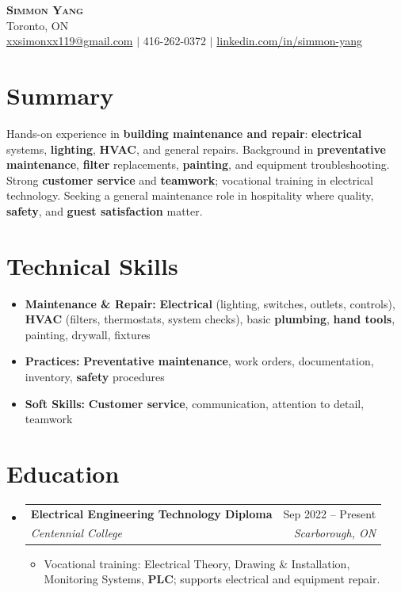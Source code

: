 \documentclass[letterpaper,11pt]{article}
\makeatletter
\newcommand{\resumeItem}[1]{\item\small{{#1 \vspace{-2pt}}}}
\newcommand{\resumeSubheading}[4]{
  \vspace{-2pt}\item
    \begin{tabular*}{0.97\textwidth}[t]{l@{\extracolsep{\fill}}r}
      \textbf{#1} & #2 \\
      \textit{\small #3} & \textit{\small #4} \\
    \end{tabular*}\vspace{-7pt}
}
\newcommand{\resumeSubHeadingListStart}{\begin{itemize}[leftmargin=0.15in, label={}]}
\newcommand{\resumeSubHeadingListEnd}{\end{itemize}}
\newcommand{\resumeItemListStart}{\begin{itemize}}
\newcommand{\resumeItemListEnd}{\end{itemize}\vspace{-5pt}}
\makeatother
\begin{document}
\begin{center}
    \textbf{\Huge \scshape Simmon Yang} \\ \vspace{1pt}
    Toronto, ON \\ 
    \href{mailto:xxsimonxx119@gmail.com}{xxsimonxx119@gmail.com} $|$ 416-262-0372 $|$ 
    \href{https://www.linkedin.com/in/simmon-yang/}{linkedin.com/in/simmon-yang}
\end{center}

\section{Summary}
Hands-on experience in \textbf{building maintenance and repair}: \textbf{electrical} systems, \textbf{lighting}, \textbf{HVAC}, and general repairs. Background in \textbf{preventative maintenance}, \textbf{filter} replacements, \textbf{painting}, and equipment troubleshooting. Strong \textbf{customer service} and \textbf{teamwork}; vocational training in electrical technology. Seeking a general maintenance role in hospitality where quality, \textbf{safety}, and \textbf{guest satisfaction} matter.

\section{Technical Skills}
\begin{itemize}[leftmargin=0.15in]
  \item \textbf{Maintenance \& Repair:} \textbf{Electrical} (lighting, switches, outlets, controls), \textbf{HVAC} (filters, thermostats, system checks), basic \textbf{plumbing}, \textbf{hand tools}, painting, drywall, fixtures
  \item \textbf{Practices:} \textbf{Preventative maintenance}, work orders, documentation, inventory, \textbf{safety} procedures
  \item \textbf{Soft Skills:} \textbf{Customer service}, communication, attention to detail, teamwork
\end{itemize}

\section{Education}
\resumeSubHeadingListStart
\resumeSubheading
  {Electrical Engineering Technology Diploma}{Sep 2022 -- Present}
  {Centennial College}{Scarborough, ON}
\resumeItemListStart
  \resumeItem{Vocational training: Electrical Theory, Drawing \& Installation, Monitoring Systems, \textbf{PLC}; supports electrical and equipment repair.}
\resumeItemListEnd
\resumeSubHeadingListEnd
\end{document}
